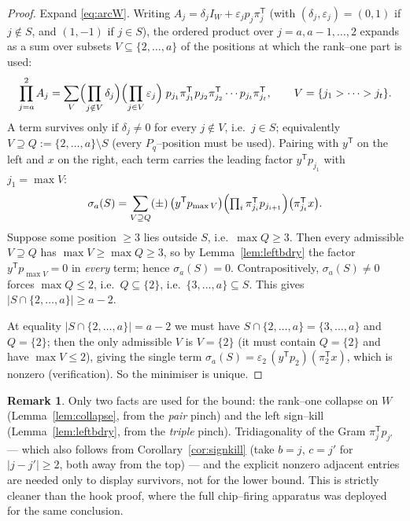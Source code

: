 \documentclass[11pt]{article}
\theoremstyle{definition}
\newtheorem{remark}[theorem]{Remark}
\newcommand{\Pq}{P_{q}}
\newcommand{\W}{W}
\begin{document}
\begin{proof}
Expand \eqref{eq:arcW}. Writing $A_j=\delta_jI_\W+\varepsilon_jp_j\pi_j^{\mathsf T}$
(with $(\delta_j,\varepsilon_j)=(0,1)$ if $j\notin S$, and $(1,-1)$ if $j\in S$), the
ordered product over $j=a,a-1,\dots,2$ expands as a sum over subsets
$V\subseteq\{2,\dots,a\}$ of the positions at which the rank--one part is used:
\[
\prod_{j=a}^2 A_j=\sum_{V}\Bigl(\prod_{j\notin V}\delta_j\Bigr)\Bigl(\prod_{j\in V}\varepsilon_j\Bigr)
\;p_{j_1}\pi_{j_1}^{\mathsf T}p_{j_2}\pi_{j_2}^{\mathsf T}\cdots p_{j_t}\pi_{j_t}^{\mathsf T},
\qquad V=\{j_1>\cdots>j_t\}.
\]
A term survives only if $\delta_j\ne0$ for every $j\notin V$, i.e.\ $j\in S$; equivalently
$V\supseteq Q:=\{2,\dots,a\}\setminus S$ (every $\Pq$--position must be used). Pairing with
$y^{\mathsf T}$ on the left and $x$ on the right, each term carries the leading factor
$y^{\mathsf T}p_{j_1}$ with $j_1=\max V$:
\[
\sigma_a(S)=\sum_{V\supseteq Q}(\pm)\,\bigl(y^{\mathsf T}p_{\max V}\bigr)
\Bigl(\textstyle\prod_i \pi_{j_i}^{\mathsf T}p_{j_{i+1}}\Bigr)\bigl(\pi_{j_t}^{\mathsf T}x\bigr).
\]
Suppose some position $\ge3$ lies outside $S$, i.e.\ $\max Q\ge3$. Then every admissible
$V\supseteq Q$ has $\max V\ge\max Q\ge3$, so by Lemma~\ref{lem:leftbdry} the factor
$y^{\mathsf T}p_{\max V}=0$ in \emph{every} term; hence $\sigma_a(S)=0$. Contrapositively,
$\sigma_a(S)\ne0$ forces $\max Q\le2$, i.e.\ $Q\subseteq\{2\}$, i.e.\ $\{3,\dots,a\}\subseteq S$.
This gives $|S\cap\{2,\dots,a\}|\ge a-2$.

At equality $|S\cap\{2,\dots,a\}|=a-2$ we must have $S\cap\{2,\dots,a\}=\{3,\dots,a\}$ and
$Q=\{2\}$; then the only admissible $V$ is $V=\{2\}$ (it must contain $Q=\{2\}$ and have
$\max V\le2$), giving the single term $\sigma_a(S)=\varepsilon_2\,(y^{\mathsf T}p_2)(\pi_2^{\mathsf T}x)$,
which is nonzero (verification). So the minimiser is unique.
\end{proof}

\begin{remark}
Only two facts are used for the bound: the rank--one collapse on $\W$
(Lemma~\ref{lem:collapse}, from the \emph{pair} pinch) and the left sign--kill
(Lemma~\ref{lem:leftbdry}, from the \emph{triple} pinch). Tridiagonality of the Gram
$\pi_j^{\mathsf T}p_{j'}$ --- which also follows from Corollary~\ref{cor:signkill}
(take $b=j$, $c=j'$ for $|j-j'|\ge2$, both away from the top) --- and the explicit
nonzero adjacent entries are needed only to display survivors, not for the lower bound.
This is strictly cleaner than the hook proof, where the full chip--firing apparatus was
deployed for the same conclusion.
\end{remark}
\end{document}
